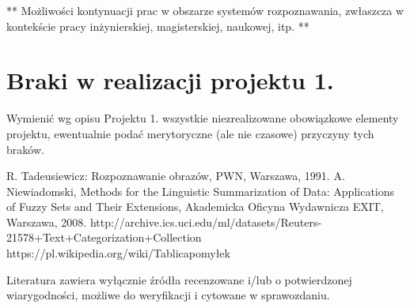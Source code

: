 \documentclass{classrep}
\begin{document}
** Możliwości kontynuacji prac w obszarze systemów rozpoznawania, zwłaszcza w kontekście pracy inżynierskiej,
magisterskiej, naukowej, itp. **\\



\section{Braki w realizacji projektu 1.}
Wymienić wg opisu Projektu 1. wszystkie niezrealizowane obowiązkowe elementy projektu, ewentualnie
podać merytoryczne (ale nie czasowe) przyczyny tych braków. 


\begin{thebibliography}{0}
 R. Tadeusiewicz: Rozpoznawanie obrazów, PWN, Warszawa, 1991.  
 A. Niewiadomski, Methods for the Linguistic Summarization of Data: Applications of Fuzzy Sets and Their Extensions, Akademicka Oficyna Wydawnicza EXIT, Warszawa, 2008.
 http://archive.ics.uci.edu/ml/datasets/Reuters-21578+Text+Categorization+Collection
 https://pl.wikipedia.org/wiki/Tablica\textunderscore pomyłek
\end{thebibliography}

Literatura zawiera wyłącznie źródła recenzowane i/lub o potwierdzonej wiarygodności,
możliwe do weryfikacji i cytowane w sprawozdaniu. 
\end{document}
